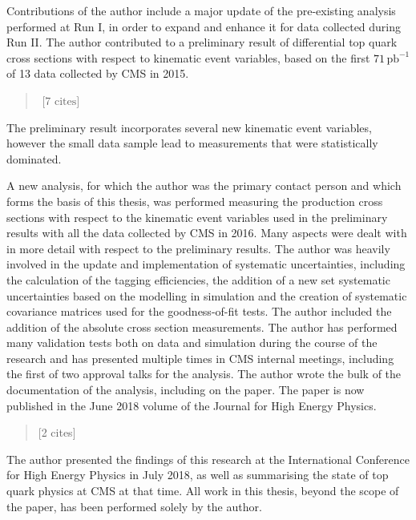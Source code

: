Contributions of the author include a major update of the pre-existing analysis performed at Run I, in order to expand and enhance it for data collected during Run II.
The author contributed to a preliminary result of differential top quark cross sections with respect to kinematic event variables, based on the first $71\,\mathrm{pb}^{-1}$ of 13\TeV{} data collected by CMS in 2015.
\begin{quote}
\,\,$\text{[7 cites]}$
\end{quote}
The preliminary result incorporates several new kinematic event variables, however the small data sample lead to measurements that were statistically dominated.

A new analysis, for which the author was the primary contact person and which forms the basis of this thesis, was performed measuring the \ttbar{} production cross sections with respect to the kinematic event variables used in the preliminary results with all the data collected by CMS in 2016.
Many aspects were dealt with in more detail with respect to the preliminary results.
The author was heavily involved in the update and implementation of systematic uncertainties, including the calculation of the \bquark{} tagging efficiencies, the addition of a new set systematic uncertainties based on the modelling in simulation and the creation of systematic covariance matrices used for the goodness-of-fit tests.
The author included the addition of the absolute cross section measurements.
The author has performed many validation tests both on data and simulation during the course of the research and has presented multiple times in CMS internal meetings, including the first of two approval talks for the analysis.
The author wrote the bulk of the documentation of the analysis, including on the paper.
The paper is now published in the June 2018 volume of the Journal for High Energy Physics.
\begin{quote}
 [2 cites]
\end{quote}
The author presented the findings of this research at the International Conference for High Energy Physics in July 2018, as well as summarising the state of top quark physics at CMS at that time.
All work in this thesis, beyond the scope of the paper, has been performed solely by the author.

